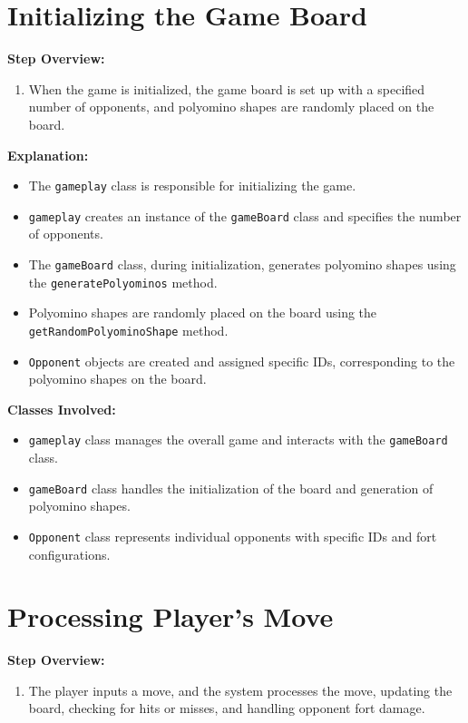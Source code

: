 \documentclass{article}
\begin{document}
\section*{Initializing the Game Board}
\textbf{Step Overview:}
\begin{enumerate}[label=\arabic*.]
    \item When the game is initialized, the game board is set up with a specified number of opponents, and polyomino shapes are randomly placed on the board.
\end{enumerate}

\textbf{Explanation:}
\begin{itemize}
    \item The \texttt{gameplay} class is responsible for initializing the game.
    \item \texttt{gameplay} creates an instance of the \texttt{gameBoard} class and specifies the number of opponents.
    \item The \texttt{gameBoard} class, during initialization, generates polyomino shapes using the \texttt{generatePolyominos} method.
    \item Polyomino shapes are randomly placed on the board using the \texttt{getRandomPolyominoShape} method.
    \item \texttt{Opponent} objects are created and assigned specific IDs, corresponding to the polyomino shapes on the board.
\end{itemize}

\textbf{Classes Involved:}
\begin{itemize}
    \item \texttt{gameplay} class manages the overall game and interacts with the \texttt{gameBoard} class.
    \item \texttt{gameBoard} class handles the initialization of the board and generation of polyomino shapes.
    \item \texttt{Opponent} class represents individual opponents with specific IDs and fort configurations.
\end{itemize}

\section*{Processing Player's Move}
\textbf{Step Overview:}
\begin{enumerate}[label=\arabic*.]
    \item The player inputs a move, and the system processes the move, updating the board, checking for hits or misses, and handling opponent fort damage.
\end{enumerate}
\end{document}
